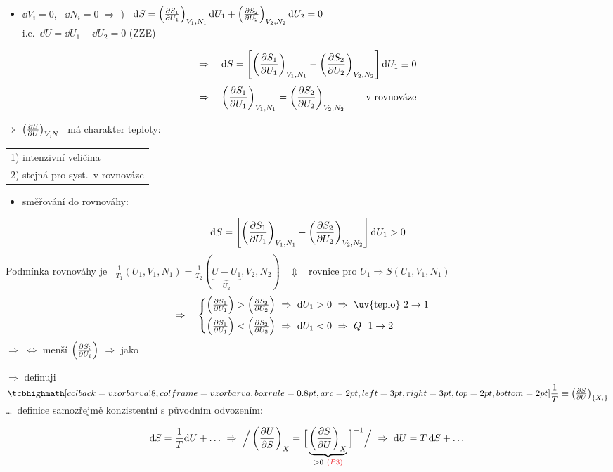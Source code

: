 \begin{itemize}
  \item $\dd V_i = 0$, \ $\dd N_i = 0$ \quad $\Rightarrow$ ) \
  $\dd S = \left(\pdv{S_1}{U_1}\right)_{V_1,N_1}\dd U_1 + \left(\pdv{S_2}{U_2}\right)_{V_2,N_2}\dd U_2 = 0$ \\
  \hspace*{6.4cm} i.e.\ $\dd U = \dd U_1 + \dd U_2 = 0$ \quad (ZZE)
\end{itemize}
\[
  \Rightarrow\quad \dd S = \left[\left(\pdv{S_1}{U_1}\right)_{V_1,N_1} - \left(\pdv{S_2}{U_2}\right)_{V_2,N_2}\right]\dd U_1 \equiv 0
\]
\[
  \Rightarrow\quad \left(\pdv{S_1}{U_1}\right)_{V_1,N_1} = \left(\pdv{S_2}{U_2}\right)_{V_2,N_2} \qquad \text{v rovnováze}
\]

\begin{veta}[Teplota]
$\Rightarrow\ \left(\pdv{S}{U}\right)_{V,N}$ \ má charakter teploty: \quad
\begin{tabular}[t]{l}
1) intenzivní veličina \\
2) stejná pro syst.\ v rovnováze
\end{tabular}
\end{veta}

\strana{L04b-2}
\begin{itemize}
  \item směřování do rovnováhy:
\end{itemize}
\[
  \dd S = \left[\left(\pdv{S_1}{U_1}\right)_{V_1,N_1} - \left(\pdv{S_2}{U_2}\right)_{V_2,N_2}\right]\dd U_1 > 0
\]
\textcolor{NavyBlue}{\small Podmínka rovnováhy je \
$\frac{1}{T_1}(U_1,V_1,N_1) = \frac{1}{T_2}(\underbrace{U - U_1}_{U_2}, V_2, N_2)$
\ $\Updownarrow$ \ rovnice pro $U_1 \Rightarrow S(U_1,V_1,N_1)$}
\[
  \Rightarrow\quad
  \begin{cases}
    \left(\pdv{S_1}{U_1}\right) > \left(\pdv{S_2}{U_2}\right) \ \Rightarrow\ \dd U_1 > 0 \ \Rightarrow\ \text{\uv{teplo} } 2\to 1 \\[6pt]
    \left(\pdv{S_1}{U_1}\right) < \left(\pdv{S_2}{U_2}\right) \ \Rightarrow\ \dd U_1 < 0 \ \Rightarrow\ Q\ \ 1\to 2
  \end{cases}
\]
$\Rightarrow$  $\Leftrightarrow$ menší $\left(\pdv{S_i}{U_i}\right)$ \quad $\Rightarrow$ jako 

\begin{definice}[Teplota]
$\Rightarrow$ definuji \qquad
$\vzorec{\dfrac{1}{T} \equiv \left(\pdv{S}{U}\right)_{\{X_i\}}}$
\qquad \dots\ definice samozřejmě konzistentní s původním odvozením:
\end{definice}
\[
  \dd S = \frac{1}{T}\dd U + \dots \ \Rightarrow\
  \Big/\left(\pdv{U}{S}\right)_X = \Big[\underbrace{\left(\pdv{S}{U}\right)_X}_{>0\ \textcolor{Red}{(P3)}}\Big]^{-1}\Big/
  \ \Rightarrow\ \dd U = T\,\dd S + \dots
\]

